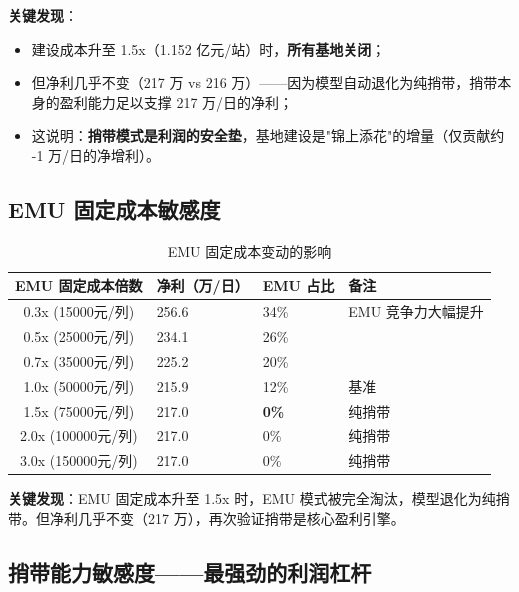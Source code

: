 \documentclass[12pt,a4paper,fontset=none]{ctexart}
\begin{document}
\textbf{关键发现}：
\begin{itemize}
    \item 建设成本升至 1.5x（1.152 亿元/站）时，\textbf{所有基地关闭}；
    \item 但净利几乎不变（217 万 vs 216 万）——因为模型自动退化为纯捎带，捎带本身的盈利能力足以支撑 217 万/日的净利；
    \item 这说明：\textbf{捎带模式是利润的安全垫}，基地建设是"锦上添花"的增量（仅贡献约 -1 万/日的净增利）。
\end{itemize}

\subsection{EMU 固定成本敏感度}

\begin{table}[H]
\centering\small
\caption{EMU 固定成本变动的影响}
\begin{tabular}{cC{2.2cm}C{2cm}C{2cm}}
\toprule
EMU 固定成本倍数 & 净利（万/日） & EMU 占比 & 备注 \\
\midrule
0.3x (15000元/列) & 256.6 & 34\% & EMU 竞争力大幅提升 \\
0.5x (25000元/列) & 234.1 & 26\% & \\
0.7x (35000元/列) & 225.2 & 20\% & \\
1.0x (50000元/列) & 215.9 & 12\% & 基准 \\
\midrule
{}
1.5x (75000元/列) & 217.0 & \textbf{0\%} & 纯捎带 \\
2.0x (100000元/列) & 217.0 & 0\% & 纯捎带 \\
3.0x (150000元/列) & 217.0 & 0\% & 纯捎带 \\
\bottomrule
\end{tabular}
\end{table}

\textbf{关键发现}：EMU 固定成本升至 1.5x 时，EMU 模式被完全淘汰，模型退化为纯捎带。但净利几乎不变（217 万），再次验证捎带是核心盈利引擎。

\subsection{捎带能力敏感度——最强劲的利润杠杆}
\end{document}
